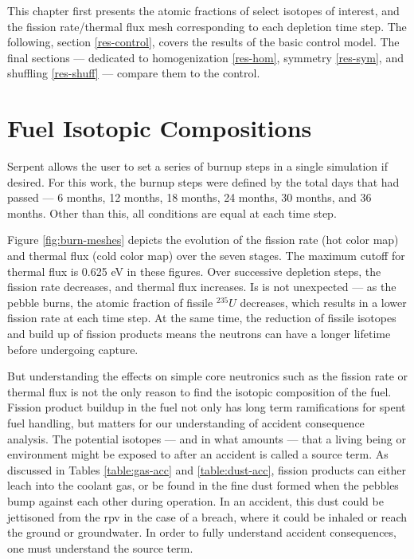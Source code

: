 This chapter first presents the atomic fractions of select isotopes of interest, and the fission rate/thermal flux mesh corresponding to each depletion time step.  The following, section \autoref{res-control}, covers the results of the basic control model. The final sections --- dedicated to homogenization \autoref{res-hom}, symmetry \autoref{res-sym}, and shuffling \autoref{res-shuff} --- compare them to the control.

\section{Fuel Isotopic Compositions}

Serpent allows the user to set a series of burnup steps in a single simulation if desired.  For this work, the burnup steps were defined by the total days that had passed --- 6 months, 12 months, 18 months, 24 months, 30 months, and 36 months.  Other than this, all conditions are equal at each time step.



Figure \ref{fig:burn-meshes} depicts the evolution of the fission rate (hot color map) and thermal flux (cold color map) over the seven stages.  The maximum cutoff for thermal flux is 0.625 eV in these figures.  Over successive depletion steps, the fission rate decreases, and thermal flux increases.  Is is not unexpected --- as the pebble burns, the atomic fraction of fissile $^235U$ decreases, which results in a lower fission rate at each time step.  At the same time, the reduction of fissile isotopes and build up of fission products means the neutrons can have a longer lifetime before undergoing capture.

But understanding the effects on simple core neutronics such as the fission rate or thermal flux is not the only reason to find the isotopic composition of the fuel.  Fission product buildup in the fuel not only has long term ramifications for spent fuel handling, but matters for our understanding of accident consequence analysis.  The potential isotopes --- and in what amounts --- that a living being or environment might be exposed to after an accident is called a source term.  As discussed in Tables \ref{table:gas-acc} and \ref{table:dust-acc}, fission products can either leach into the coolant gas, or be found in the fine dust formed when the pebbles bump against each other during operation.  In an accident, this dust could be jettisoned from the \acrshort{rpv} in the case of a breach, where it could be inhaled or reach the ground or groundwater.  In order to fully understand accident consequences, one must understand the source term.


